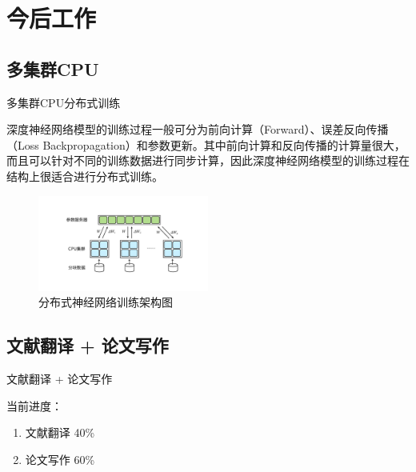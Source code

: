 \section{今后工作}

\subsection{多集群CPU}

    \begin{frame}{多集群CPU分布式训练}
    \begin{block}{}
    深度神经网络模型的训练过程一般可分为前向计算（Forward）、误差反向传播（Loss Backpropagation）和参数更新。其中前向计算和反向传播的计算量很大，而且可以针对不同的训练数据进行同步计算，因此深度神经网络模型的训练过程在结构上很适合进行分布式训练。
    \end{block}
    \begin{figure}
    \centering
    \includegraphics[width=0.5\textwidth]{figures/dist}
    \caption{分布式神经网络训练架构图}
    \label{fig:dist}
    \end{figure}
    \end{frame}

\subsection{文献翻译 + 论文写作}

    \begin{frame}{文献翻译 + 论文写作}
    \begin{block}{}
    当前进度：
    \begin{enumerate}
        \item 文献翻译 40\%
        \item 论文写作 60\%
    \end{enumerate}
    \end{block}
    \end{frame}
